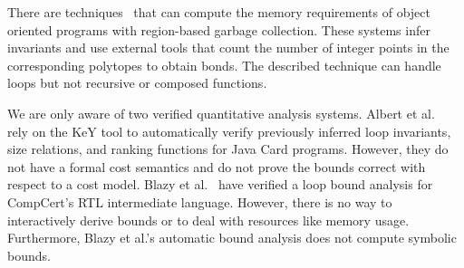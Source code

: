 \documentclass[nocopyrightspace,preprint,pldi]{sigplanconf-pldi15}
\begin{document}
There are techniques~\cite{Braberman08} that can compute the memory
requirements of object oriented programs with region-based garbage
collection.  These systems infer invariants and use external tools
that count the number of integer points in the corresponding polytopes
to obtain bonds.  The described technique can handle loops but not
recursive or composed functions.

We are only aware of two verified quantitative analysis systems.
Albert et al.~\cite{AlbertBGHR12} rely on the KeY tool to
automatically verify previously inferred loop invariants, size
relations, and ranking functions for Java Card programs.  However,
they do not have a formal cost semantics and do not prove the bounds
correct with respect to a cost model.  Blazy et al.~\cite{Blazy13}
have verified a loop bound analysis for CompCert's RTL intermediate
language.  However, there is no way to interactively derive bounds or
to deal with resources like memory usage.  Furthermore, Blazy et al.'s
automatic bound analysis does not compute symbolic bounds.


\newcommand{\loopbody}[0]{\ensuremath{\code{if~(x - 10 \geq 0)~\{x=x{-}10; tick(5);\}~else~break;}}}
\end{document}
